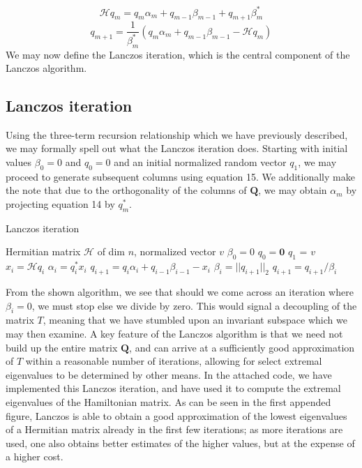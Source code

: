 \documentclass[12pt]{article} %
\begin{document}
\begin{equation}
    \mathcal{H} q_m = q_m \alpha_m + q_{m-1} \beta_{m-1} + q_{m+1}\beta^*_m
\end{equation}
\begin{equation}
    q_{m+1} = \frac{1}{\beta^*_m}(q_m \alpha_m + q_{m-1}\beta_{m-1} - \mathcal{H}q_m)
\end{equation}
We may now define the Lanczos iteration, which is the central component of the Lanczos algorithm.
\subsection{Lanczos iteration}
Using the three-term recursion relationship which we have previously described, we may formally spell out what the Lanczos iteration does. Starting with initial values $\beta_0 = 0$ and $q_0 = 0$ and an initial normalized random vector $q_1$, we may proceed to generate subsequent columns using equation 15. We additionally make the note that due to the orthogonality of the columns of $\textbf{Q}$, we may obtain $\alpha_m$ by projecting equation 14 by $q^*_m$.
\begin{algorithm}
    \caption{Lanczos iteration}
    \begin{algorithmic}[1]
    \REQUIRE Hermitian matrix $\mathcal{H}$ of dim $n$, normalized vector $v$
    \STATE $\beta_0 = 0$
    \STATE $q_0 = \textbf{0}$
    \STATE $q_1$ = $v$
        \STATE $x_i = \mathcal{H}q_{i}$
        \STATE $\alpha_i = q_{i}^* x_i$
        \STATE $q_{i+1} = q_i \alpha_i + q_{i-1}\beta_{i-1} - x_i$ 
        \STATE $\beta_i = ||q_{i+1}||_2$
        \STATE $q_{i+1} = q_{i+1}/ \beta_i$
    \ENDFOR
    \end{algorithmic}
\end{algorithm}
From the shown algorithm, we see that should we come across an iteration where $\beta_i = 0$, we must stop else we divide by zero. This would signal a decoupling of the matrix $T$, meaning that we have stumbled upon an invariant subspace which we may then examine. A key feature of the Lanczos algorithm is that we need not build up the entire matrix $\textbf{Q}$, and can arrive at a sufficiently good approximation of $T$ within a reasonable number of iterations, allowing for select extremal eigenvalues to be determined by other means. In the attached code, we have implemented this Lanczos iteration, and have used it to compute the extremal eigenvalues of the Hamiltonian matrix. As can be seen in the first appended figure, Lanczos is able to obtain a good approximation of the lowest eigenvalues of a Hermitian matrix already in the first few iterations; as more iterations are used, one also obtains better estimates of the higher values, but at the expense of a higher cost.
\end{document}
